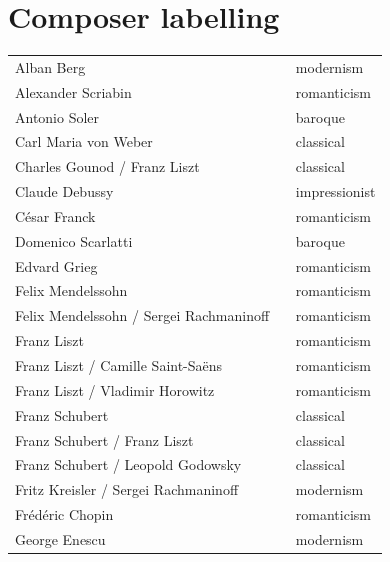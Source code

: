 \documentclass[a4paper]{book}
\begin{document}
\printbibliography

\appendix

\chapter{Composer labelling} \label{appendix:labelling}

\begin{center}
\begin{supertabular}{p{0.75\linewidth}|p{0.25\linewidth}}
Alban Berg & modernism \\ 
Alexander Scriabin & romanticism \\ 
Antonio Soler & baroque \\ 
Carl Maria von Weber & classical \\ 
Charles Gounod / Franz Liszt & classical \\ 
Claude Debussy & impressionist \\ 
César Franck & romanticism \\ 
Domenico Scarlatti & baroque \\ 
Edvard Grieg & romanticism \\ 
Felix Mendelssohn & romanticism \\ 
Felix Mendelssohn / Sergei Rachmaninoff & romanticism \\ 
Franz Liszt & romanticism \\ 
Franz Liszt / Camille Saint-Saëns & romanticism \\ 
Franz Liszt / Vladimir Horowitz & romanticism \\ 
Franz Schubert & classical \\ 
Franz Schubert / Franz Liszt & classical \\ 
Franz Schubert / Leopold Godowsky & classical \\ 
Fritz Kreisler / Sergei Rachmaninoff & modernism \\ 
Frédéric Chopin & romanticism \\ 
George Enescu & modernism \\ 

\end{supertabular}
\end{center}
\end{document}
